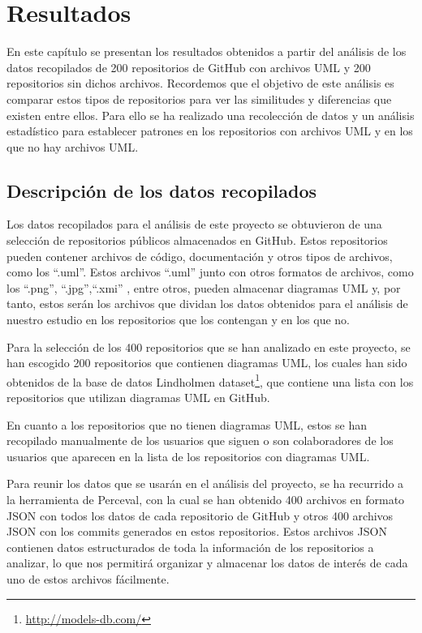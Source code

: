 \documentclass[a4paper, 12pt]{book}
\begin{document}
\cleardoublepage
\chapter{Resultados}
\label{chap:resultados}

 
En este capítulo se presentan los resultados obtenidos a partir del análisis de los datos recopilados de 200 repositorios de GitHub con archivos UML y 200 repositorios sin dichos archivos.
Recordemos que el objetivo de este análisis es comparar estos tipos de repositorios para ver las similitudes y diferencias que existen entre ellos.
Para ello se ha realizado una recolección de datos y un análisis estadístico para establecer patrones en los repositorios con archivos UML y en los que no hay archivos UML.


\section{Descripción de los datos recopilados}
\label{sec:descripción de los datos recopilado}

Los datos recopilados para el análisis de este proyecto se obtuvieron de una selección de repositorios públicos almacenados en GitHub. 
Estos repositorios pueden contener archivos de código, documentación y otros tipos de archivos, como los  ``.uml''.
Estos archivos ``.uml'' junto con otros formatos de archivos, como los ``.png'', ``.jpg'',``.xmi'' , entre otros, pueden almacenar diagramas UML y, por tanto, estos serán los archivos que dividan los datos obtenidos para el análisis de nuestro estudio en los repositorios que los contengan y en los que no.


Para la selección de los 400 repositorios que se han analizado en este proyecto, se han escogido 200 repositorios que contienen diagramas UML, los cuales han sido obtenidos de la base de datos Lindholmen dataset\footnote{\url{http://models-db.com/}}, que contiene una lista con los repositorios que utilizan diagramas UML en GitHub.


En cuanto a los repositorios que no tienen diagramas UML, estos se han recopilado manualmente de los usuarios que siguen o son colaboradores de los usuarios que aparecen en la lista de los repositorios con diagramas UML.


Para reunir los datos que se usarán en el análisis del proyecto, se ha recurrido a la herramienta de Perceval, con la cual se han obtenido 400 archivos en formato JSON con todos los datos de cada repositorio de GitHub y otros 400 archivos JSON con los commits generados en estos repositorios.
Estos archivos JSON contienen datos estructurados de toda la información de los repositorios a analizar, lo que nos permitirá organizar y almacenar los datos de interés de cada uno de estos archivos fácilmente. 
\end{document}
